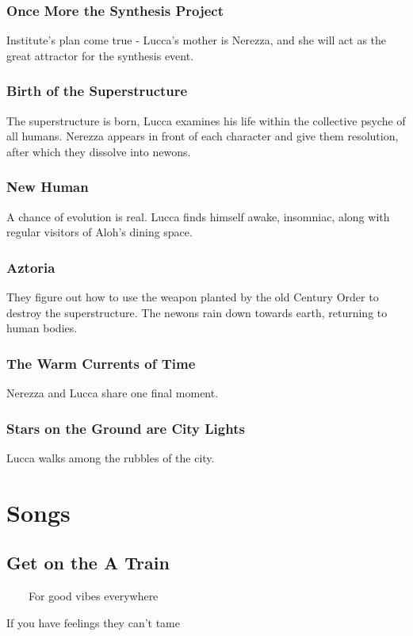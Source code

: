 \documentclass[11pt]{article}
\begin{document}
		\subsubsection{Once More the Synthesis Project}
		Institute's plan come true - Lucca's mother is Nerezza, and she will act as the great attractor for the synthesis event.
		\subsubsection{Birth of the Superstructure}
		The superstructure is born, Lucca examines his life within the collective psyche of all humans. 
		Nerezza appears in front of each character and give them resolution, after which they dissolve into newons.
		\subsubsection{New Human}
		A chance of evolution is real. 
		Lucca finds himself awake, insomniac, along with regular visitors of Aloh's dining space.
		\subsubsection{Aztoria}
		They figure out how to use the weapon planted by the old Century Order to destroy the superstructure.
		The newons rain down towards earth, returning to human bodies.
		\subsubsection{The Warm Currents of Time}
		Nerezza and Lucca share one final moment.
		\subsubsection{Stars on the Ground are City Lights}
		Lucca walks among the rubbles of the city.
\newpage








\section{Songs}
	\subsection{Get on the A Train}
	\ \ \ \ For good vibes everywhere
	
	If you have feelings they can't tame
	
\end{document}
